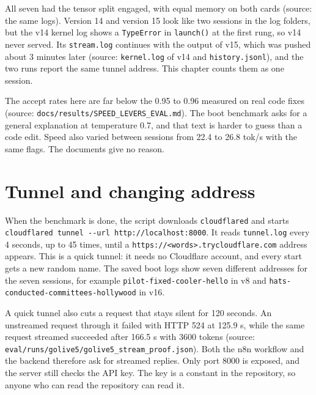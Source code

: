 \documentclass[11pt,a4paper]{report}
\begin{document}
All seven had the tensor split engaged, with equal memory on both cards (source: the same logs). Version 14 and version 15 look like two sessions in the log folders, but the v14 kernel log shows a \texttt{TypeError} in \texttt{launch()} at the first rung, so v14 never served. Its \texttt{stream.\allowbreak{}log} continues with the output of v15, which was pushed about 3 minutes later (source: \texttt{kernel.\allowbreak{}log} of v14 and \texttt{history.\allowbreak{}jsonl}), and the two runs report the same tunnel address. This chapter counts them as one session.

The accept rates here are far below the 0.95 to 0.96 measured on real code fixes (source: \texttt{docs/\allowbreak{}results/\allowbreak{}SPEED\_\allowbreak{}LEVERS\_\allowbreak{}EVAL.\allowbreak{}md}). The boot benchmark asks for a general explanation at temperature 0.7, and that text is harder to guess than a code edit. Speed also varied between sessions from 22.4 to 26.8 tok/s with the same flags. The documents give no reason.

\section{Tunnel and changing address}

When the benchmark is done, the script downloads \texttt{cloudflared} and starts \texttt{cloudflared tunnel -\allowbreak{}-\allowbreak{}url http:/\allowbreak{}/\allowbreak{}localhost:8000}. It reads \texttt{tunnel.\allowbreak{}log} every 4 seconds, up to 45 times, until a \texttt{https:/\allowbreak{}/\allowbreak{}\textless{}words\textgreater{}.\allowbreak{}trycloudflare.\allowbreak{}com} address appears. This is a quick tunnel: it needs no Cloudflare account, and every start gets a new random name. The saved boot logs show seven different addresses for the seven sessions, for example \texttt{pilot-\allowbreak{}fixed-\allowbreak{}cooler-\allowbreak{}hello} in v8 and \texttt{hats-\allowbreak{}conducted-\allowbreak{}committees-\allowbreak{}hollywood} in v16.

A quick tunnel also cuts a request that stays silent for 120 seconds. An unstreamed request through it failed with HTTP 524 at 125.9 s, while the same request streamed succeeded after 166.5 s with 3600 tokens (source: \texttt{eval/\allowbreak{}runs/\allowbreak{}golive5/\allowbreak{}golive5\_\allowbreak{}stream\_\allowbreak{}proof.\allowbreak{}json}). Both the n8n workflow and the backend therefore ask for streamed replies. Only port 8000 is exposed, and the server still checks the API key. The key is a constant in the repository, so anyone who can read the repository can read it.
\end{document}
